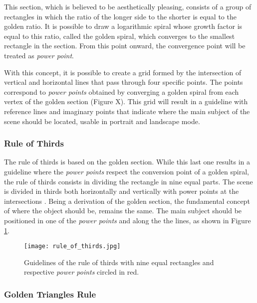This section, which is believed to be aesthetically pleasing, consists of a group of rectangles in which the ratio of the longer side to the shorter is equal to the golden ratio. It is possible to draw a logarithmic spiral whose growth factor is equal to this ratio, called the golden spiral, which converges to the smallest rectangle in the section. From this point onward, the convergence point will be treated as \emph{power point}. 

With this concept, it is possible to create a grid formed by the intersection of vertical and horizontal lines that pass through four specific points. The points correspond to \emph{power points} obtained by converging a golden spiral from each vertex of the golden section (Figure X). This grid will result in a guideline with reference lines and imaginary points that indicate where the main subject of the scene should be located, usable in portrait and landscape mode.

\subsubsection{Rule of Thirds}
\label{subsub:rule_thirds}

The rule of thirds is based on the golden section. While this last one results in a guideline where the \emph{power points} respect the conversion point of a golden spiral, the rule of thirds consists in dividing the rectangle in nine equal parts. The scene is divided in thirds both horizontally and vertically with power points at the intersections \cite{Santos}.
Being a derivation of the golden section, the fundamental concept of where the object should be, remains the same. The main subject should be positioned in one of the \emph{power points} and along the the lines, as shown in Figure \ref{fig:rule_of_thirds_image}.

\begin{figure}[htbp]
    \centering
	\label{fig:rule_of_thirds_example}
    \texttt{[image: rule\_of\_thirds.jpg]}
	\caption{Guidelines of the rule of thirds with nine equal rectangles and respective \emph{power points} circled in red.}
	\label{fig:rule_of_thirds_image}
\end{figure}

\subsubsection{Golden Triangles Rule}
\label{subsub:rule_triangles}

